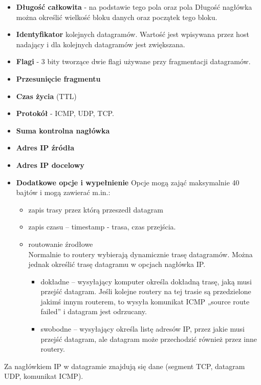 \documentclass[../main.tex]{subfiles}
\begin{document}
\begin{itemize}
        \item \textbf{Długość całkowita} - na podstawie tego pola oraz pola Długość nagłówka można określić wielkość bloku danych oraz początek tego bloku.
        \item \textbf{Identyfikator} kolejnych datagramów. Wartość jest wpisywana przez host nadający i dla kolejnych datagramów jest zwiększana.
        \item \textbf{Flagi} - 3 bity tworzące dwie flagi używane przy fragmentacji datagramów.
        \item \textbf{Przesunięcie fragmentu}
        \item \textbf{Czas życia} (TTL)
        \item \textbf{Protokół} - ICMP, UDP, TCP.
        \item \textbf{Suma kontrolna nagłówka}
        \item \textbf{Adres IP źródła}
        \item \textbf{Adres IP docelowy}
        \item \textbf{Dodatkowe opcje i wypełnienie}
        Opcje mogą zająć maksymalnie 40 bajtów i mogą zawierać m.in.:
        \begin{itemize}
            \item zapis trasy przez którą przeszedł datagram
            \item zapis czasu – timestamp - trasa, czas przejścia.
            \item routowanie źrodłowe\\
            Normalnie to routery wybierają dynamicznie trasę datagramów. Można jednak określić trasę datagramu w opcjach nagłówka IP.
            \begin{itemize}
                \item  dokładne – wysyłający komputer określa dokładną trasę, jaką musi przejść datagram. Jeśli kolejne routery na tej trasie są przedzielone jakimś innym routerem, to wysyła komunikat ICMP „source route failed” i datagram jest odrzucany.
                \item swobodne – wysyłający określa listę adresów IP, przez jakie musi przejść datagram, ale datagram może przechodzić również przez inne routery.
            \end{itemize}
        \end{itemize}
    \end{itemize}
    Za nagłówkiem IP w datagramie znajdują się dane (segment TCP, datagram UDP, komunikat ICMP).
\end{document}
